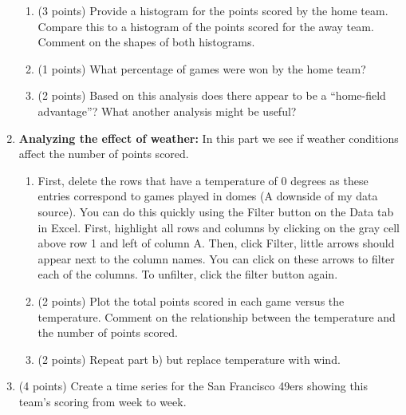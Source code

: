 \documentclass{article}    %
\begin{document}
\begin{enumerate}
\begin{enumerate}
\item (3 points) Provide a histogram for the points scored by the home team.  Compare this to a histogram of the points scored for the away team.  Comment on the shapes of both histograms.

\item (1 points) What percentage of games were won by the home team?

\item (2 points) Based on this analysis does there appear to be a ``home-field advantage''?  What another analysis might be useful?


\end{enumerate}

\item  \textbf{Analyzing the effect of weather:} In this part we see if weather conditions affect the number of points scored.

\begin{enumerate}
\item First, delete the rows that have a temperature of 0 degrees as these entries correspond to games played in domes (A downside of my data source).  You can do this quickly using the Filter button on the Data tab in Excel.  First, highlight all rows and columns by clicking on the gray cell above row 1 and left of column A.  Then, click Filter, little arrows should appear next to the column names.  You can click on these arrows to filter each of the columns. To unfilter, click the filter button again.

\item (2 points) Plot the total points scored in each game versus the temperature.  Comment on the relationship between the temperature and the number of points scored.

\item (2 points) Repeat part b) but replace temperature with wind.


\end{enumerate}



\item (4 points) Create a time series for the San Francisco 49ers showing this team's scoring from week to week.

\end{enumerate}
\end{document}
